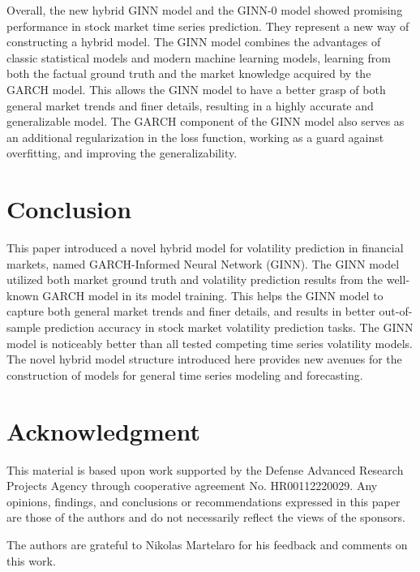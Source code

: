 Overall, the new hybrid GINN model and the GINN-0 model showed promising performance in stock market time series prediction. They represent a new way of constructing a hybrid model. The GINN model combines the advantages of classic statistical models and modern machine learning models, learning from both the factual ground truth and the market knowledge acquired by the GARCH model. This allows the GINN model to have a better grasp of both general market trends and finer details, resulting in a highly accurate and generalizable model. The GARCH component of the GINN model also serves as an additional regularization in the loss function, working as a guard against overfitting, and improving the generalizability. 

\section{Conclusion}
This paper introduced a novel hybrid model for volatility prediction in financial markets, named GARCH-Informed Neural Network (GINN). The GINN model utilized both market ground truth and volatility prediction results from the well-known GARCH model in its model training. This helps the GINN model to capture both general market trends and finer details, and results in better out-of-sample prediction accuracy in stock market volatility prediction tasks. The GINN model is noticeably better than all tested competing time series volatility models. The novel hybrid model structure introduced here provides new avenues for the construction of models for general time series modeling and forecasting. 

\section*{Acknowledgment}
This material is based upon work supported by the Defense Advanced Research Projects Agency through cooperative agreement No. HR00112220029. Any opinions, findings, and conclusions or recommendations expressed in this paper are those of the authors and do not necessarily reflect the views of the sponsors. 

The authors are grateful to Nikolas Martelaro for his feedback and comments on this work.


